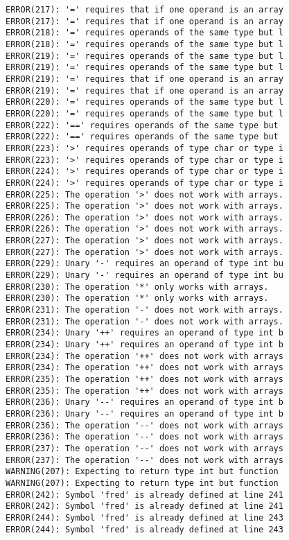 \documentclass[12pt]{book}
\begin{document}
\begin{lstlisting}
ERROR(217): '=' requires that if one operand is an array	ERROR(217): '=' requires that if one operand is an array
ERROR(218): '=' requires operands of the same type but l	ERROR(218): '=' requires operands of the same type but l
ERROR(219): '=' requires operands of the same type but l	ERROR(219): '=' requires operands of the same type but l
ERROR(219): '=' requires that if one operand is an array	ERROR(219): '=' requires that if one operand is an array
ERROR(220): '=' requires operands of the same type but l	ERROR(220): '=' requires operands of the same type but l
ERROR(222): '==' requires operands of the same type but 	ERROR(222): '==' requires operands of the same type but 
ERROR(223): '>' requires operands of type char or type i	ERROR(223): '>' requires operands of type char or type i
ERROR(224): '>' requires operands of type char or type i	ERROR(224): '>' requires operands of type char or type i
ERROR(225): The operation '>' does not work with arrays.	ERROR(225): The operation '>' does not work with arrays.
ERROR(226): The operation '>' does not work with arrays.	ERROR(226): The operation '>' does not work with arrays.
ERROR(227): The operation '>' does not work with arrays.	ERROR(227): The operation '>' does not work with arrays.
ERROR(229): Unary '-' requires an operand of type int bu	ERROR(229): Unary '-' requires an operand of type int bu
ERROR(230): The operation '*' only works with arrays.		ERROR(230): The operation '*' only works with arrays.
ERROR(231): The operation '-' does not work with arrays.	ERROR(231): The operation '-' does not work with arrays.
ERROR(234): Unary '++' requires an operand of type int b	ERROR(234): Unary '++' requires an operand of type int b
ERROR(234): The operation '++' does not work with arrays	ERROR(234): The operation '++' does not work with arrays
ERROR(235): The operation '++' does not work with arrays	ERROR(235): The operation '++' does not work with arrays
ERROR(236): Unary '--' requires an operand of type int b	ERROR(236): Unary '--' requires an operand of type int b
ERROR(236): The operation '--' does not work with arrays	ERROR(236): The operation '--' does not work with arrays
ERROR(237): The operation '--' does not work with arrays	ERROR(237): The operation '--' does not work with arrays
WARNING(207): Expecting to return type int but function 	WARNING(207): Expecting to return type int but function 
ERROR(242): Symbol 'fred' is already defined at line 241	ERROR(242): Symbol 'fred' is already defined at line 241
ERROR(244): Symbol 'fred' is already defined at line 243	ERROR(244): Symbol 'fred' is already defined at line 243

\end{lstlisting}
\end{document}
